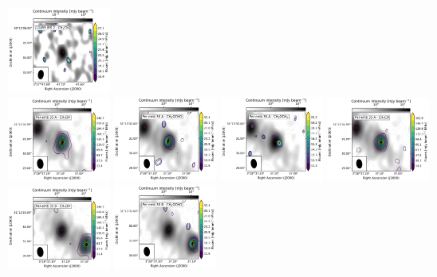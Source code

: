 \begin{figure}[htbp!]
  \includegraphics[width=0.24\textwidth]{./moment0/Set1_ID08_CH3CN_257527.pdf}
  \\
  \includegraphics[width=0.24\textwidth]{./moment0/Set2_ID07_CH3OH_243915.pdf}
  \includegraphics[width=0.24\textwidth]{./moment0/Set2_ID07_CH3OCHO_259342.pdf}
  \includegraphics[width=0.24\textwidth]{./moment0/Set2_ID07_CH3OCH3_259311.pdf}
  \includegraphics[width=0.24\textwidth]{./moment0/Set2_ID07_CH3CN_257527.pdf}
  \\
  \includegraphics[width=0.24\textwidth]{./moment0/Set2_ID07_2_CH3OH_243915.pdf}
  \includegraphics[width=0.24\textwidth]{./moment0/Set2_ID07_2_CH3OCHO_259342.pdf}

\end{figure}
